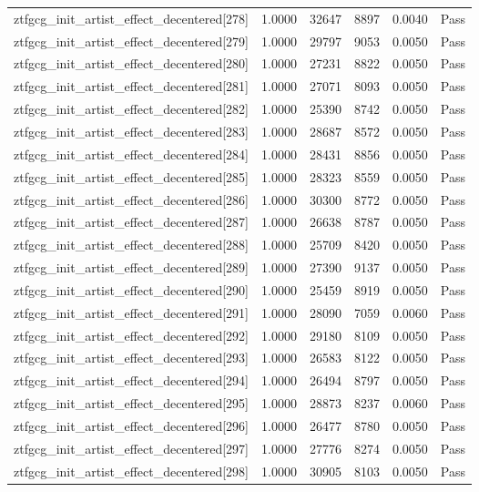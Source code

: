 \begin{table}[htbp]
\begin{tabular}{llrrll}
ztfgcg\_init\_artist\_effect\_decentered[278] & 1.0000 & 32647 & 8897 & 0.0040 & Pass \\
ztfgcg\_init\_artist\_effect\_decentered[279] & 1.0000 & 29797 & 9053 & 0.0050 & Pass \\
ztfgcg\_init\_artist\_effect\_decentered[280] & 1.0000 & 27231 & 8822 & 0.0050 & Pass \\
ztfgcg\_init\_artist\_effect\_decentered[281] & 1.0000 & 27071 & 8093 & 0.0050 & Pass \\
ztfgcg\_init\_artist\_effect\_decentered[282] & 1.0000 & 25390 & 8742 & 0.0050 & Pass \\
ztfgcg\_init\_artist\_effect\_decentered[283] & 1.0000 & 28687 & 8572 & 0.0050 & Pass \\
ztfgcg\_init\_artist\_effect\_decentered[284] & 1.0000 & 28431 & 8856 & 0.0050 & Pass \\
ztfgcg\_init\_artist\_effect\_decentered[285] & 1.0000 & 28323 & 8559 & 0.0050 & Pass \\
ztfgcg\_init\_artist\_effect\_decentered[286] & 1.0000 & 30300 & 8772 & 0.0050 & Pass \\
ztfgcg\_init\_artist\_effect\_decentered[287] & 1.0000 & 26638 & 8787 & 0.0050 & Pass \\
ztfgcg\_init\_artist\_effect\_decentered[288] & 1.0000 & 25709 & 8420 & 0.0050 & Pass \\
ztfgcg\_init\_artist\_effect\_decentered[289] & 1.0000 & 27390 & 9137 & 0.0050 & Pass \\
ztfgcg\_init\_artist\_effect\_decentered[290] & 1.0000 & 25459 & 8919 & 0.0050 & Pass \\
ztfgcg\_init\_artist\_effect\_decentered[291] & 1.0000 & 28090 & 7059 & 0.0060 & Pass \\
ztfgcg\_init\_artist\_effect\_decentered[292] & 1.0000 & 29180 & 8109 & 0.0050 & Pass \\
ztfgcg\_init\_artist\_effect\_decentered[293] & 1.0000 & 26583 & 8122 & 0.0050 & Pass \\
ztfgcg\_init\_artist\_effect\_decentered[294] & 1.0000 & 26494 & 8797 & 0.0050 & Pass \\
ztfgcg\_init\_artist\_effect\_decentered[295] & 1.0000 & 28873 & 8237 & 0.0060 & Pass \\
ztfgcg\_init\_artist\_effect\_decentered[296] & 1.0000 & 26477 & 8780 & 0.0050 & Pass \\
ztfgcg\_init\_artist\_effect\_decentered[297] & 1.0000 & 27776 & 8274 & 0.0050 & Pass \\
ztfgcg\_init\_artist\_effect\_decentered[298] & 1.0000 & 30905 & 8103 & 0.0050 & Pass \\

\end{tabular}
\end{table}

